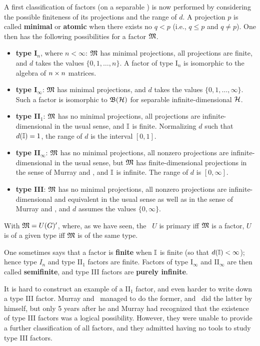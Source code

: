 A first classification of factors (on a separable \Hs) is now
performed by considering the possible finiteness of its projections
and the range of $d$.  A projection $p$ is called {\bf minimal} or
{\bf atomic} when there exists no $q<p$ (i.e., $q\leq p$ and $q\neq
p$). One then has the following possibilities for a factor ${\frak M}$.
\begin{itemize}
\item 
{\bf type I$\mbox{}_n$}, where $n<\infty$: ${\frak M}$ has minimal
projections, all projections are finite, and $d$ takes the values
$\{0,1,\ldots,n\}$. A factor of type I$\mbox{}_n$ is isomorphic to the
algebra of $n\times n$ matrices.
\item
{\bf type I$\mbox{}_{\infty}$}: ${\frak M}$ has minimal projections, and $d$
takes the values $\{0,1,\ldots,\infty\}$. Such a factor is isomorphic
to ${\frak B}({\cal H})$ for separable infinite-dimensional ${\cal H}$.
\item
{\bf type II$\mbox{}_1$}: ${\frak M}$ has no minimal projections, all
projections are infinite-dimensional in the usual sense, and ${\Bbb I}$ is
finite. Normalizing $d$ such that $d({\Bbb I})=1$, the range of $d$ is the
interval $[0,1]$.
\item
{\bf type II$\mbox{}_{\infty}$}: ${\frak M}$ has no minimal projections, all
nonzero projections are infinite-dimensional in the usual sense, but
${\frak M}$ has finite-dimensional projections in the sense of Murray and
\vN, and ${\Bbb I}$ is infinite. The range of $d$ is $[0,\infty]$.
\item
{\bf type III}: ${\frak M}$ has no minimal projections, all nonzero
projections are infinite-dimensional and equivalent in the usual sense
as well as in the sense of Murray and \vN, and $d$ assumes the values
$\{0,\infty\}$.
\end{itemize}

With ${\frak M}=U(G)'$, where, as we have seen, the \rep\ $U$ is primary iff
${\frak M}$ is a factor, $U$ is of a given type iff ${\frak M}$ is of the same type.

One sometimes says that a factor is {\bf finite} when ${\Bbb I}$ is finite
(so that $d({\Bbb I})<\infty$); hence type $I_n$ and type II$\mbox{}_1$
factors are finite. Factors of type I$\mbox{}_{\infty}$ and
II$\mbox{}_{\infty}$ are then called {\bf semifinite}, and type III
factors are {\bf purely infinite}.

It is hard to construct an example of a II$\mbox{}_1$ factor, and even
harder to write down a type III factor. Murray and \vN\ managed to do
the former, and \vN\ did the latter by himself, but only 5 years after
he and Murray had recognized that the existence of type III factors
was a logical possibility. However, they were unable to provide a
further classification of all factors, and they admitted having no
tools to study type III factors.

